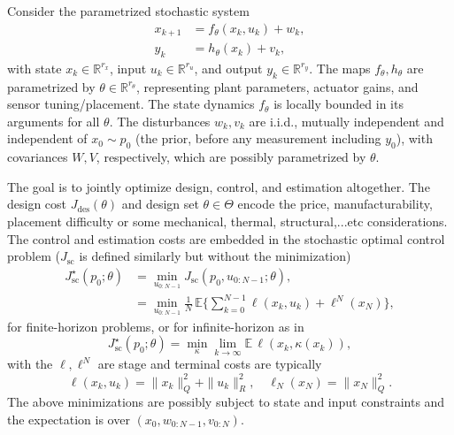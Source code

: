 \documentclass[twocolumn,amsthm]{autart}
\begin{document}
Consider the parametrized stochastic system
\begin{subequations}\label{eq:ss}
\begin{align}
x_{k+1} &= f_\theta(x_k, u_k) + w_k, \label{eq:ss-state}\\
y_k     &= h_\theta(x_k) + v_k, \label{eq:ss-output}
\end{align}
\end{subequations}
with state $x_k \in \mathbb{R}^{r_x}$, input $u_k \in \mathbb{R}^{r_u}$, and
output $y_k \in \mathbb{R}^{r_y}$. The maps $f_\theta, h_\theta$ are parametrized by $\theta \in \mathbb{R}^{r_\theta}$, representing plant parameters, actuator gains, and sensor tuning/placement. The state dynamics $f_\theta$ is locally bounded in its arguments for all $\theta$. The disturbances $w_k, v_k$ are i.i.d.,
mutually independent and independent of $x_0 \sim p_0$ (the prior, before any
measurement including $y_0$), with covariances $W,V$, respectively, which are possibly parametrized by $\theta$.

The goal is to jointly optimize design, control, and estimation altogether. The
design cost $J_{\mathrm{des}}(\theta)$ and design set $\theta \in \Theta$
encode the price, manufacturability, placement difficulty or some mechanical, thermal, structural,...etc considerations. The
control and estimation costs are embedded in the stochastic optimal control problem ($J_{\mathrm{sc}}$ is defined similarly but without the minimization)
\begin{equation} \label{eq:Jstoch_N}
\begin{aligned}
J_{\mathrm{sc}}^\star(p_0;\theta) &= \min_{u_{0:N-1}} J_{\mathrm{sc}}(p_0,u_{0:N-1};\theta),\\
&=\min_{u_{0:N-1}} \frac{1}{N}\,
\mathbb{E}\big\{ \sum_{k=0}^{N-1} \ell(x_k,u_k) + \ell^N(x_N) \big\},
\end{aligned}
\end{equation}
for finite-horizon problems, or for infinite-horizon as in 
\begin{equation}\label{eq:Jstoch_infty}
J_{\mathrm{sc}}^\star(p_0;\theta) = \min_{\kappa} \lim_{k \to \infty} \mathbb{E} \, \ell(x_k,\kappa(x_k)),
\end{equation}
with the $\ell, \ell^N$ are stage and terminal costs are typically
\begin{equation*}
   \ell(x_k,u_k) = \|x_k \|_Q ^2 + \| u_k\|_R^2, \quad \ell_N(x_N) = \| x_N \|_Q^2.
\end{equation*}
The above minimizations are possibly subject to state and input constraints and the expectation is over $(x_0, w_{0:N-1}, v_{0:N})$.
\end{document}
